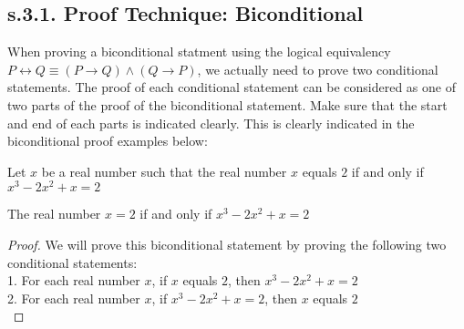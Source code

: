 \newpage
\subsection{s.3.1. Proof Technique: Biconditional}
When proving a biconditional statment using the logical equivalency $P \leftrightarrow Q \equiv (P \to Q) \wedge (Q \to P)$, we actually need to prove two conditional statements. The proof of each conditional statement can be considered as one of two parts of the proof of the biconditional statement. Make sure that the start and end of each parts is indicated clearly. This is clearly indicated in the biconditional proof examples below: 

\begin{example}
Let $x$ be a real number such that the real number $x$ equals $2$ if and only if $x^3 - 2x^2 + x = 2$

\begin{tcolorbox}
	\begin{theorem}
		The real number $x = 2$ if and only if $x^3 - 2x^2 + x = 2 $
	\end{theorem}
\end{tcolorbox}

\begin{proof}
We will prove this biconditional statement by proving the following two conditional statements: \\
1. For each real number $x$, if $x$ equals $2$, then $x^3 -2x^2 + x = 2$ \\
2. For each real number $x$, if $x^3 -2x^2 + x = 2$, then $x$ equals $2$ \\


\end{proof}
\end{example}
